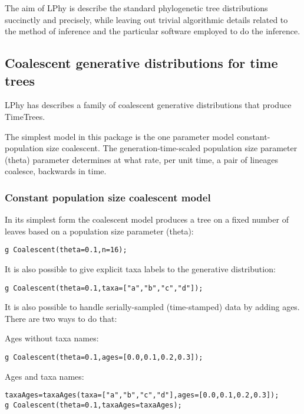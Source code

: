 \documentclass[10pt,letterpaper,table]{article}
\begin{document}
The aim of LPhy is describe the standard phylogenetic tree
distributions succinctly and precisely, while leaving out trivial algorithmic details related to the method
of inference and the particular software employed to do the inference.

\subsection*{Coalescent generative distributions for time trees}

LPhy has describes a family of coalescent generative distributions
that produce TimeTrees.

The simplest model in this package is the one parameter model
constant-population size coalescent.
The generation-time-scaled population size parameter (theta) parameter determines at
what rate, per unit time, a pair of lineages coalesce, backwards in time.

\subsubsection*{Constant population size coalescent model}

In its simplest form \cite{kingman81} the coalescent model produces a
tree on a fixed number of leaves based on a population size parameter (theta):

\begin{alltt}
  g ~ Coalescent(theta=0.1, n=16);
\end{alltt}

It is also possible to give explicit taxa labels to the generative
distribution:

\begin{alltt}
  g ~ Coalescent(theta=0.1, taxa=["a", "b", "c", "d"]);
\end{alltt}

It is also possible to handle serially-sampled (time-stamped) data by
adding ages.
There are two ways to do that:

Ages without taxa names:

\begin{alltt}
  g ~ Coalescent(theta=0.1, ages=[0.0, 0.1, 0.2, 0.3]);
\end{alltt}

Ages and taxa names:

\begin{alltt}
  taxaAges = taxaAges(taxa=["a", "b", "c", "d"], ages=[0.0, 0.1, 0.2, 0.3]);
  g ~ Coalescent(theta=0.1, taxaAges=taxaAges);
\end{alltt}
\end{document}
